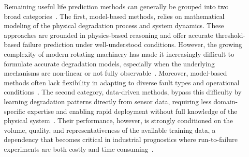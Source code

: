 \documentclass[review]{elsarticle}
\begin{document}
Remaining useful life prediction methods can generally be grouped
into two broad categories~\cite{shang_capsule_2024, bai_towards_2024}.
The first, model-based methods, relies on mathematical modeling of
the physical degradation process and system dynamics. These approaches
are grounded in physics-based reasoning and offer accurate
threshold-based failure prediction under well-understood conditions.
However, the growing complexity of modern rotating machinery has made
it increasingly difficult to formulate accurate degradation models,
especially when the underlying mechanisms are non-linear or not fully
observable~\cite{heimes_recurrent_2008}. Moreover, model-based methods
often lack flexibility in adapting to diverse fault types and
operational conditions~\cite{shang_capsule_2024}. The second category,
data-driven methods, bypass this difficulty by learning
degradation patterns directly from sensor data, requiring less
domain-specific expertise and enabling rapid deployment without full
knowledge of the physical system~\cite{datadriven,
heimes_recurrent_2008}. Their performance, however, is strongly
conditioned on the volume, quality, and representativeness of the
available training data, a dependency that becomes critical in
industrial prognostics where run-to-failure experiments are both costly
and time-consuming~\cite{s25144481, pan2025remaining}.\\
\end{document}
